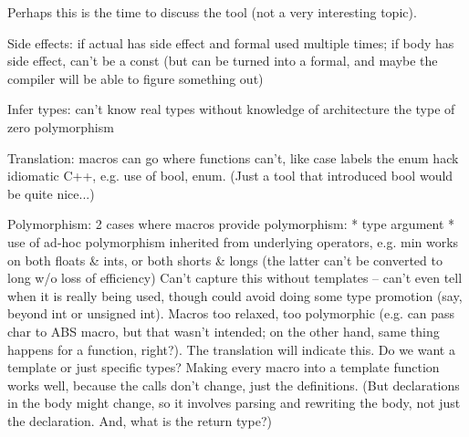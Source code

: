 \documentclass{slides}
\begin{document}
\begin{note}
Perhaps this is the time to discuss the tool (not a very interesting
topic).

Side effects: if actual has side effect and formal used multiple times; if
body has side effect, can't be a const (but can be turned into a formal, and
maybe the compiler will be able to figure something out)

Infer types:
 can't know real types without knowledge of architecture
 the type of zero
 polymorphism

Translation:
 macros can go where functions can't, like case labels
 the enum hack
 idiomatic C++, e.g. use of bool, enum.  (Just a tool that introduced bool
     would be quite nice...)
\end{note}

\begin{note}
Polymorphism:
2 cases where macros provide polymorphism:
 * type argument
 * use of ad-hoc polymorphism inherited from underlying operators, e.g.
     min works on both floats \& ints, or both shorts \& longs (the latter
     can't be converted to long w/o loss of efficiency)
Can't capture this without templates -- can't even tell when it is
really being used, though could avoid doing some type promotion (say,
beyond int or unsigned int).
Macros too relaxed, too polymorphic (e.g. can pass char to ABS macro, but
that wasn't intended; on the other hand, same thing happens for a function,
right?).  The translation will indicate this.  Do we want a
template or just specific types?
Making every macro into a template function works well, because the calls
don't change, just the definitions.  (But declarations in the body might
change, so it involves parsing and rewriting the body, not just the
declaration.  And, what is the return type?)
\end{note}
\end{document}
